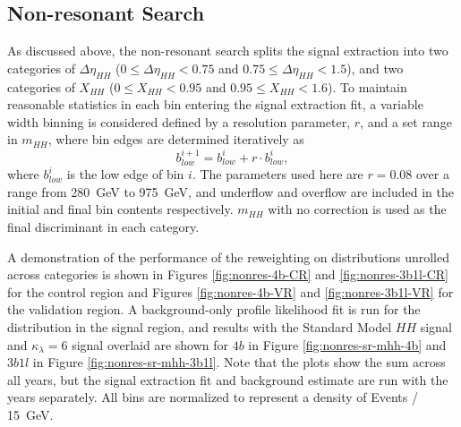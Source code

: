 \subsection{Non-resonant Search}
As discussed above, the non-resonant search splits the signal extraction into two categories of 
$\Delta\eta_{HH}$ ($0 \leq \Delta\eta_{HH} < 0.75$ and $0.75 \leq \Delta\eta_{HH} < 1.5$), 
and two categories of $X_{HH}$ ($0 \leq X_{HH} < 0.95$ and $0.95 \leq X_{HH} < 1.6$). 
To maintain reasonable statistics in each bin entering the signal extraction fit, a 
variable width binning is considered defined by a resolution parameter, $r$, and a set range in 
$m_{HH}$, where bin edges are determined iteratively as
\begin{equation}
b_{low}^{i+1} = b_{low}^{i} + r\cdot b_{low}^{i},
\end{equation}
where $b_{low}^{i}$ is the low edge of bin $i$. The parameters used here are 
$r=0.08$ over a range from \SI{280}{\GeV} to \SI{975}{\GeV}, and underflow and 
overflow are included in the initial and final bin contents respectively. $m_{HH}$ with 
no correction is used as the final discriminant in each category.

A demonstration of the performance of the reweighting on distributions unrolled across categories is shown 
in Figures \ref{fig:nonres-4b-CR} and \ref{fig:nonres-3b1l-CR} for the control region and 
Figures \ref{fig:nonres-4b-VR} and \ref{fig:nonres-3b1l-VR} for 
the validation region. A background-only profile likelihood fit is run for the distribution in the signal 
region, and results with the Standard Model $HH$ signal and $\kappa_{\lambda}=6$ signal overlaid are shown for $4b$ in Figure \ref{fig:nonres-sr-mhh-4b} and $3b1l$ in Figure \ref{fig:nonres-sr-mhh-3b1l}. Note that 
the plots show the sum across all years, but the signal extraction fit and background estimate are run with the 
years separately. All bins are normalized to represent a density of Events / \SI{15}{\GeV}.

